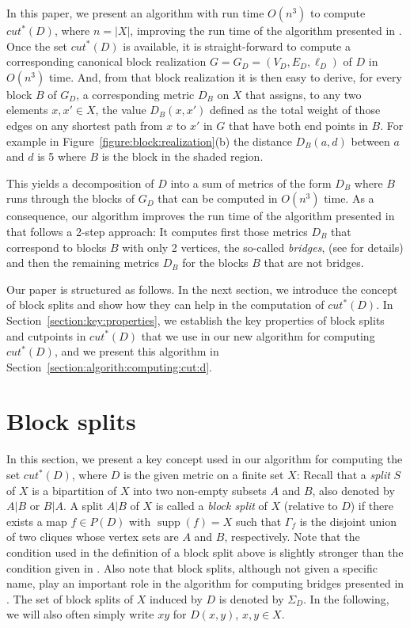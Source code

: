 \documentclass[12pt]{article}
\DeclareMathOperator*{\supp}{supp}
\begin{document}
In this paper, we present an algorithm with run time \(O(n^3)\) to compute \(cut^*(D)\),
where \(n = |X|\), improving the run time of the algorithm presented
in \cite{dress:virtual:cutpoints:2007}. Once the set \(cut^*(D)\) is available, 
it is straight-forward to compute a corresponding canonical 
block realization \(G=G_D=(V_D,E_D,\ell_D)\) of \(D\) in \(O(n^3)\) time.
And, from that block realization it is then easy
to derive, for every block $B$ of $G_D$, a 
corresponding metric $D_B$ on $X$ that assigns, to any two elements
$x,x'\in X$, the value $D_B(x,x')$ defined as the
total weight of those edges on any shortest path
from $x$ to $x'$ in $G$ that have both
end points in $B$. For example in Figure~\ref{figure:block:realization}(b) 
the distance $D_B(a,d)$ between
$a$ and $d$ is 5 where $B$ is the block in the
shaded region.

This yields a decomposition of \(D\) into 
a sum of metrics 
of the form 
\(D_B\) where \(B\) runs through the
blocks of \(G_D\) that can
be computed in \(O(n^3)\) time. As a consequence, our algorithm improves 
the run time of the algorithm presented in 
\cite{hertz:varone:cutpoint:partition} 
that follows a 2-step approach: It computes
first those metrics 
\(D_B\) that correspond to blocks \(B\) with only 2 vertices, the so-called
\emph{bridges}, (see \cite{hertz:varone:bridge:partition} for
details) and then the remaining metrics \(D_B\) for the blocks \(B\) that
are not bridges.

Our paper is structured as follows. In the next section, we
introduce the concept of block splits and show how they can help in the computation
of \(cut^*(D)\). In Section~\ref{section:key:properties}, we establish the key properties
of block splits and cutpoints in \(cut^*(D)\) that we use in our new algorithm
for computing \(cut^*(D)\), and
we present this algorithm in Section~\ref{section:algorith:computing:cut:d}.


\section{Block splits}
\label{section:block:splits}


In this section, we present a key concept used
in our algorithm for computing the set \(cut^*(D)\),
where \(D\) is the given metric on a finite set \(X\):
Recall that a \emph{split} \(S\) of \(X\) is a bipartition of \(X\)
into two non-empty subsets \(A\) and \(B\), also denoted by \(A|B\) or \(B|A\).
A split \(A|B\) of \(X\) is called a \emph{block split}
of \(X\) (relative to \(D\)) if there exists a map 
\(f \in P(D)\) with \(\supp(f)=X\)
such that \(\Gamma_f\) is the disjoint union of two cliques whose
vertex sets are \(A\) and \(B\), respectively. 
Note that the condition used in the definition of a block
split above is slightly stronger than the condition
given in \cite[p. 10]{imrich:optimal:realizations:1984}. Also note
that block splits, although not given a specific name,
play an important role in the algorithm for
computing bridges presented in \cite{hertz:varone:bridge:partition}.
The set of block splits of \(X\) induced by \(D\) is  denoted by \(\Sigma_D\). 
In the following, we will also often simply write 
\(xy\) for \(D(x,y)\), \(x,y \in X\).
\end{document}
